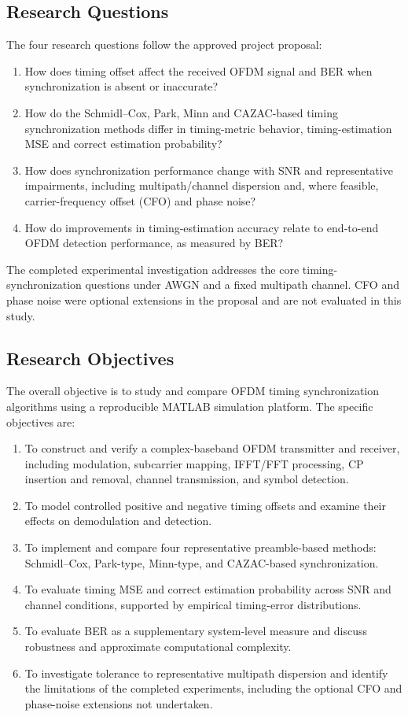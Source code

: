 \subsection{Research Questions}
The four research questions follow the approved project proposal:
\begin{enumerate}
\item[\textbf{RQ1.}] How does timing offset affect the received OFDM signal and BER when synchronization is absent or inaccurate?
\item[\textbf{RQ2.}] How do the Schmidl--Cox, Park, Minn and CAZAC-based timing synchronization methods differ in timing-metric behavior, timing-estimation MSE and correct estimation probability?
\item[\textbf{RQ3.}] How does synchronization performance change with SNR and representative impairments, including multipath/channel dispersion and, where feasible, carrier-frequency offset (CFO) and phase noise?
\item[\textbf{RQ4.}] How do improvements in timing-estimation accuracy relate to end-to-end OFDM detection performance, as measured by BER?
\end{enumerate}
The completed experimental investigation addresses the core timing-synchronization questions under AWGN and a fixed multipath channel. CFO and phase noise were optional extensions in the proposal and are not evaluated in this study.

\subsection{Research Objectives}
The overall objective is to study and compare OFDM timing synchronization algorithms using a reproducible MATLAB simulation platform. The specific objectives are:
\begin{enumerate}
\item To construct and verify a complex-baseband OFDM transmitter and receiver, including modulation, subcarrier mapping, IFFT/FFT processing, CP insertion and removal, channel transmission, and symbol detection.
\item To model controlled positive and negative timing offsets and examine their effects on demodulation and detection.
\item To implement and compare four representative preamble-based methods: Schmidl--Cox, Park-type, Minn-type, and CAZAC-based synchronization.
\item To evaluate timing MSE and correct estimation probability across SNR and channel conditions, supported by empirical timing-error distributions.
\item To evaluate BER as a supplementary system-level measure and discuss robustness and approximate computational complexity.
\item To investigate tolerance to representative multipath dispersion and identify the limitations of the completed experiments, including the optional CFO and phase-noise extensions not undertaken.
\end{enumerate}

